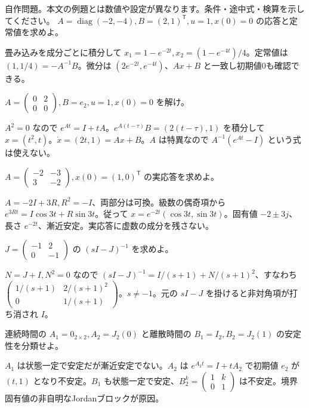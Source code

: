 \documentclass[11pt]{article}
\begin{document}
自作問題。本文の例題とは数値や設定が異なります。条件・途中式・検算を示してください。
\problem[入力応答]
$A=\operatorname{diag}(-2,-4),B=(2,1)^{\mathsf T},u=1,x(0)=0$ の応答と定常値を求めよ。
\begin{ans}
畳み込みを成分ごとに積分して $x_1=1-e^{-2t},x_2=(1-e^{-4t})/4$。定常値は $(1,1/4)=-A^{-1}B$。微分は $(2e^{-2t},e^{-4t})$、$Ax+B$ と一致し初期値0も確認できる。
\end{ans}
\problem[特異な状態行列]
$A=\begin{pmatrix}0&2\\0&0\end{pmatrix},B=e_2,u=1,x(0)=0$ を解け。
\begin{ans}
$A^2=0$ なので $e^{At}=I+tA$。$e^{A(t-\tau)}B=(2(t-\tau),1)$ を積分して $x=(t^2,t)$。$\dot x=(2t,1)=Ax+B$。$A$ は特異なので $A^{-1}(e^{At}-I)$ という式は使えない。
\end{ans}
\newpage
\problem[減衰する回転]
$A=\begin{pmatrix}-2&-3\\3&-2\end{pmatrix},x(0)=(1,0)^{\mathsf T}$ の実応答を求めよ。
\begin{ans}
$A=-2I+3R,R^2=-I$、両部分は可換。級数の偶奇項から $e^{3Rt}=I\cos3t+R\sin3t$。従って $x=e^{-2t}(\cos3t,\sin3t)$。固有値 $-2\pm3j$、長さ $e^{-2t}$、漸近安定。実応答に虚数の成分を残さない。
\end{ans}
\problem[レゾルベント]
$J=\begin{pmatrix}-1&2\\0&-1\end{pmatrix}$ の $(sI-J)^{-1}$ を求めよ。
\begin{ans}
$N=J+I,N^2=0$ なので $(sI-J)^{-1}=I/(s+1)+N/(s+1)^2$、すなわち $\begin{pmatrix}1/(s+1)&2/(s+1)^2\\0&1/(s+1)\end{pmatrix}$。$s\ne-1$。元の $sI-J$ を掛けると非対角項が打ち消され $I$。
\end{ans}
\newpage
\problem[境界の安定性]
連続時間の $A_1=0_{2\times2},A_2=J_2(0)$ と離散時間の $B_1=I_2,B_2=J_2(1)$ の安定性を分類せよ。
\begin{ans}
$A_1$ は状態一定で安定だが漸近安定でない。$A_2$ は $e^{A_2t}=I+tA_2$ で初期値 $e_2$ が $(t,1)$ となり不安定。$B_1$ も状態一定で安定、$B_2^k=\begin{pmatrix}1&k\\0&1\end{pmatrix}$ は不安定。境界固有値の非自明なJordanブロックが原因。
\end{ans}
\end{document}
